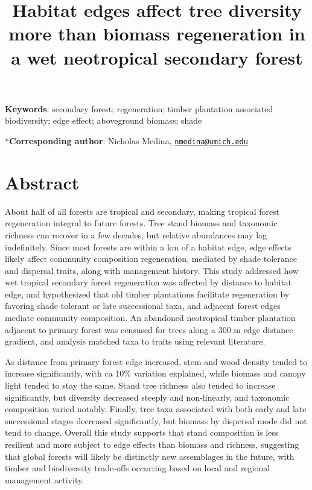 \documentclass[
  12pt,
]{article}
\title{Habitat edges affect tree diversity more than biomass regeneration in a wet neotropical secondary forest}
\author{}
\date{\vspace{-2.5em}}
\begin{document}
\maketitle

\hfill\break
\hfill\break

\textbf{Keywords}: secondary forest; regeneration; timber plantation associated biodiversity; edge effect; aboveground biomass; shade

\hfill\break
\hfill\break

*\textbf{Corresponding author}: Nicholas Medina, \href{mailto:nmedina@umich.edu}{\nolinkurl{nmedina@umich.edu}}

\newpage

\hypertarget{abstract}{%
\section*{Abstract}\label{abstract}}

About half of all forests are tropical and secondary, making tropical forest regeneration integral to future forests.
Tree stand biomass and taxonomic richness can recover in a few decades, but relative abundances may lag indefinitely.
Since most forests are within a km of a habitat edge, edge effects likely affect community composition regeneration, mediated by shade tolerance and dispersal traits, along with management history.
This study addressed how wet tropical secondary forest regeneration was affected by distance to habitat edge, and hypothesized that old timber plantations facilitate regeneration by favoring shade tolerant or late successional taxa, and adjacent forest edges mediate community composition.
An abandoned neotropical timber plantation adjacent to primary forest was censused for trees along a 300 m edge distance gradient, and analysis matched taxa to traits using relevant literature.

As distance from primary forest edge increased, stem and wood density tended to increase significantly, with ca 10\% variation explained, while biomass and canopy light tended to stay the same.
Stand tree richness also tended to increase significantly, but diversity decreased steeply and non-linearly, and taxonomic composition varied notably.
Finally, tree taxa associated with both early and late successional stages decreased significantly, but biomass by dispersal mode did not tend to change.
Overall this study supports that stand composition is less resilient and more subject to edge effects than biomass and richness, suggesting that global forests will likely be distinctly new assemblages in the future, with timber and biodiversity trade-offs occurring based on local and regional management activity.
\end{document}

